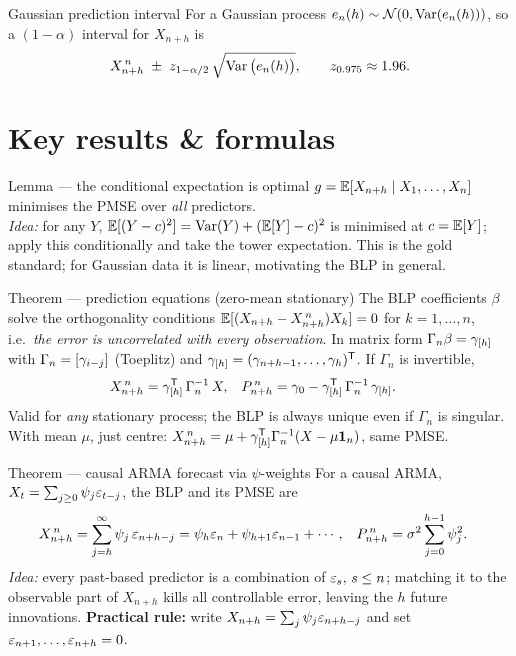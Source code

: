 \documentclass[11pt]{article}
\begin{document}
\begin{defn}{Gaussian prediction interval}
For a Gaussian process $e_n(h)\sim\mathcal N(0,\operatorname{Var}(e_n(h)))$, so a $(1-\alpha)$ interval for
$X_{n+h}$ is
\[
X^{\,n}_{n+h}\;\pm\;z_{1-\alpha/2}\,\sqrt{\operatorname{Var}\big(e_n(h)\big)},
\qquad z_{0.975}\approx 1.96 .
\]
\end{defn}

\section*{Key results \& formulas}

\begin{result}{Lemma --- the conditional expectation is optimal}
$g=\mathbb{E}[X_{n+h}\mid X_1,\dots,X_n]$ minimises the PMSE over \emph{all} predictors.\\
\textit{Idea:} for any $Y$, $\mathbb{E}[(Y-c)^2]=\operatorname{Var}(Y)+(\mathbb{E}[Y]-c)^2$ is minimised at $c=\mathbb{E}[Y]$; apply this
conditionally and take the tower expectation. This is the gold standard; for Gaussian data it is
linear, motivating the BLP in general.
\end{result}

\begin{result}{Theorem --- prediction equations (zero-mean stationary)}
The BLP coefficients $\beta$ solve the orthogonality conditions
$\mathbb{E}[(X_{n+h}-X^{\,n}_{n+h})X_k]=0$ for $k=1,\dots,n$, i.e.\ \emph{the error is uncorrelated with
every observation}. In matrix form $\Gamma_n\beta=\gamma_{[h]}$ with
$\Gamma_n=[\gamma_{i-j}]$ (Toeplitz) and
$\gamma_{[h]}=(\gamma_{n+h-1},\dots,\gamma_{h})^{\mathsf{T}}$. If $\Gamma_n$ is invertible,
\[
\begin{aligned}
X^{\,n}_{n+h}&=\gamma_{[h]}^{\mathsf{T}}\,\Gamma_n^{-1}\,X,
&P^{\,n}_{n+h}&=\gamma_0-\gamma_{[h]}^{\mathsf{T}}\,\Gamma_n^{-1}\,\gamma_{[h]} .
\end{aligned}
\]
Valid for \emph{any} stationary process; the BLP is always unique even if $\Gamma_n$ is singular.
With mean $\mu$, just centre: $X^{\,n}_{n+h}=\mu+\gamma_{[h]}^{\mathsf{T}}\Gamma_n^{-1}(X-\mu\mathbf 1_n)$,
same PMSE.
\end{result}

\begin{result}{Theorem --- causal ARMA forecast via $\psi$-weights}
For a causal ARMA, $X_t=\sum_{j\ge0}\psi_j\varepsilon_{t-j}$, the BLP and its PMSE are
\[
\begin{aligned}
X^{\,n}_{n+h}&=\sum_{j=h}^{\infty}\psi_j\,\varepsilon_{n+h-j}=\psi_h\varepsilon_n+\psi_{h+1}\varepsilon_{n-1}+\cdots,
&P^{\,n}_{n+h}&=\sigma^2\sum_{j=0}^{h-1}\psi_j^2 .
\end{aligned}
\]
\textit{Idea:} every past-based predictor is a combination of $\varepsilon_s,\,s\le n$; matching it to the
observable part of $X_{n+h}$ kills all controllable error, leaving the $h$ future innovations.
\textbf{Practical rule:} write $X_{n+h}=\sum_j\psi_j\varepsilon_{n+h-j}$ and set
$\varepsilon_{n+1},\dots,\varepsilon_{n+h}=0$.
\end{result}
\end{document}
